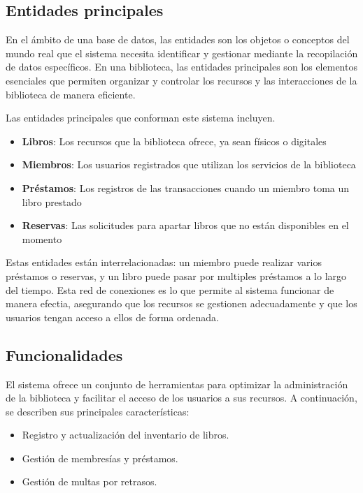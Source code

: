 \documentclass[12pt, a4paper]{article}
\begin{document}
\subsection{Entidades principales}
En el ámbito de una base de datos, las entidades son los objetos o conceptos del mundo real que el sistema necesita identificar y gestionar mediante la recopilación de datos específicos. En una biblioteca, las entidades principales son los elementos esenciales que permiten organizar y controlar los recursos y las interacciones de la biblioteca de manera eficiente.

Las entidades principales que conforman este sistema incluyen.

\begin{itemize}
    \item \textbf{Libros}: Los recursos que la biblioteca ofrece, ya sean físicos o digitales
    \item \textbf{Miembros}: Los usuarios registrados que utilizan los servicios de la biblioteca
    \item \textbf{Préstamos}: Los registros de las transacciones cuando un miembro toma un libro prestado
    \item \textbf{Reservas}: Las solicitudes para apartar libros que no están disponibles en el momento
\end{itemize}

Estas entidades están interrelacionadas: un miembro puede realizar varios préstamos o reservas, y un libro puede pasar por multiples préstamos a lo largo del tiempo. Esta red de conexiones es lo que permite al sistema funcionar de manera efectia, asegurando que los recursos se gestionen adecuadamente y que los usuarios tengan acceso a ellos de forma ordenada.

\subsection{Funcionalidades}
El sistema ofrece un conjunto de herramientas para optimizar la administración de la biblioteca y facilitar el acceso de los usuarios a sus recursos. A continuación, se describen sus principales características:
\begin{itemize}
    \item Registro y actualización del inventario de libros.
    \item Gestión de membresías y préstamos.
    \item Gestión de multas por retrasos.
\end{itemize}
\end{document}
